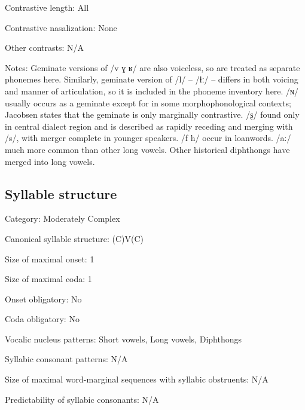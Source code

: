 {\begin{appendixdesc}
\item[Contrastive length:] All

\item[Contrastive nasalization:] None

\item[Other contrasts:] N/A

\item[Notes:] Geminate versions of /v ɣ ʁ/ are also voiceless, so are treated as separate phonemes here. Similarly, geminate version of /l/ -- /ɬː/ -- differs in both voicing and manner of articulation, so it is included in the phoneme inventory here. /ɴ/ usually occurs as a geminate except for in some morphophonological contexts; Jacobsen states that the geminate is only marginally contrastive. /ʂ/ found only in central dialect region and is described as rapidly receding and merging with /s/, with merger complete in younger speakers. /f h/ occur in loanwords. /aː/ much more common than other long vowels. Other historical diphthongs have merged into long vowels.
\end{appendixdesc}
\subsection*{Syllable structure}
\begin{appendixdesc}

\item[Category:] Moderately Complex

\item[Canonical syllable structure:] (C)V(C) \citep[338--339]{Fortescue1984}

\item[Size of maximal onset:] 1

\item[Size of maximal coda:] 1

\item[Onset obligatory:] No

\item[Coda obligatory:] No

\item[Vocalic nucleus patterns:] Short vowels, Long vowels, Diphthongs

\item[Syllabic consonant patterns:] N/A

\item[Size of maximal word-marginal sequences with syllabic obstruents:] N/A

\item[Predictability of syllabic consonants:] N/A


\end{appendixdesc}}
